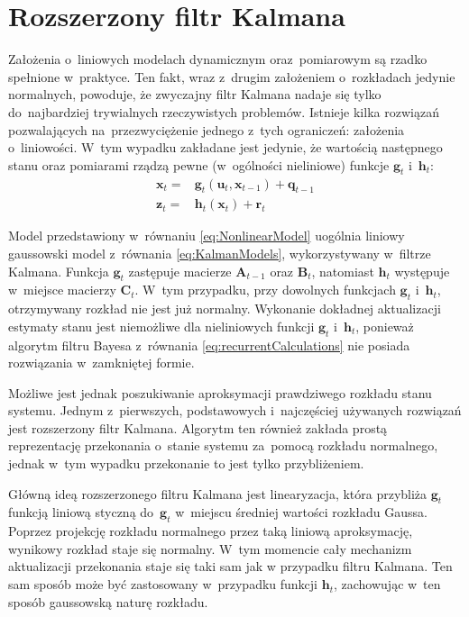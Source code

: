 \section{Rozszerzony filtr Kalmana} \label{ExtendedKalmanFilter}
Założenia o~liniowych modelach dynamicznym oraz~pomiarowym są rzadko spełnione w~praktyce. Ten fakt, wraz z~drugim założeniem o~rozkładach jedynie normalnych, powoduje, że zwyczajny filtr Kalmana nadaje się tylko do~najbardziej trywialnych rzeczywistych problemów. Istnieje kilka rozwiązań pozwalających na~przezwyciężenie jednego z~tych ograniczeń: założenia o~liniowości. W~tym wypadku zakładane jest jedynie, że wartością następnego stanu oraz pomiarami rządzą pewne (w~ogólności nieliniowe) funkcje $\boldsymbol{g}_t$ i~$\boldsymbol{h}_t$:
\begin{align} 
\boldsymbol{x}_t =& \boldsymbol{g}_t(\boldsymbol{u}_t, \boldsymbol{x}_{t-1}) + \boldsymbol{q}_{t-1} \nonumber \\
\boldsymbol{z}_t =& \boldsymbol{h}_t(\boldsymbol{x}_{t}) + \boldsymbol{r}_{t} \label{eq:NonlinearModel}
\end{align}
\par
Model przedstawiony w~równaniu \ref{eq:NonlinearModel} uogólnia liniowy gaussowski model z~równania \ref{eq:KalmanModels}, wykorzystywany w~filtrze Kalmana. Funkcja $\boldsymbol{g}_t$ zastępuje macierze $\boldsymbol{A}_{t-1}$ oraz $\boldsymbol{B}_{t}$, natomiast $\boldsymbol{h}_t$ występuje w~miejsce macierzy $\boldsymbol{C}_t$. W~tym przypadku, przy dowolnych funkcjach $\boldsymbol{g}_t$ i~$\boldsymbol{h}_t$, otrzymywany rozkład nie jest już normalny. Wykonanie dokładnej aktualizacji estymaty stanu jest niemożliwe dla nieliniowych funkcji $\boldsymbol{g}_t$ i~$\boldsymbol{h}_t$, ponieważ algorytm filtru Bayesa z~równania \ref{eq:recurrentCalculations} nie posiada rozwiązania w~zamkniętej formie.
\par
Możliwe jest jednak poszukiwanie aproksymacji prawdziwego rozkładu stanu systemu. Jednym z~pierwszych, podstawowych i~najczęściej używanych rozwiązań jest rozszerzony filtr Kalmana. Algorytm ten również zakłada prostą reprezentację przekonania o~stanie systemu za~pomocą rozkładu normalnego, jednak w~tym wypadku przekonanie to jest tylko przybliżeniem.
\par
Główną ideą rozszerzonego filtru Kalmana jest linearyzacja, która przybliża $\boldsymbol{g}_t$ funkcją liniową styczną do~$\boldsymbol{g}_t$ w~miejscu średniej wartości rozkładu Gaussa. Poprzez projekcję rozkładu normalnego przez taką liniową aproksymację, wynikowy rozkład staje się normalny. W~tym momencie cały mechanizm aktualizacji przekonania staje się taki sam jak w przypadku filtru Kalmana. Ten sam sposób może być zastosowany w~przypadku funkcji $\boldsymbol{h}_t$, zachowując w~ten sposób gaussowską naturę rozkładu.
